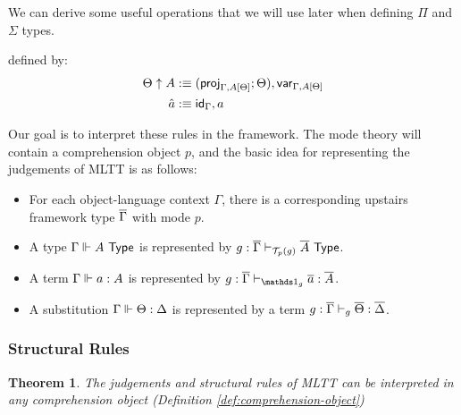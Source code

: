 \documentclass[10pt]{article}
\newtheorem{theorem}{Theorem}
\theoremstyle{definition}
\newcommand{\yields}{\vdash}
\newcommand{\TYPE}{\,\,\mathsf{Type}}
\newcommand{\id}{\mathsf{id}}
\newcommand\El[2]{\mathcal{T}_{#1}(#2)}
\begin{document}
We can derive some useful operations that we will use later when defining $\Pi$ and $\Sigma$ types.
defined by:
\begin{align*}
\Theta \uparrow A &:\equiv (\proj{\Gamma, A[\Theta]}; \Theta) , \qvar{\Gamma, A[\Theta]} \\
\hat{a} &:\equiv \id_{\Gamma} , a
\end{align*}

Our goal is to interpret these rules in the framework. The mode theory will contain a comprehension object $p$, and the basic idea for representing the judgements of MLTT is as follows:

\begin{itemize}
\item For each object-language context $\Gamma$, there is a corresponding upstairs framework type $\overline{\Gamma}$ with mode $p$.

\item A type $\Gamma \qyields A \TYPE$ is represented by $g : \upstairs{\Gamma} \yields_{\El{p}{g}} \upstairs{A} \TYPE$.
  
\item A term $\Gamma \Vdash a : A$ is represented by $g : \upstairs{\Gamma} \yields_{\One_g} \upstairs{a} : \upstairs{A}$.

\item A substitution $\Gamma \Vdash \Theta : \Delta$ is represented by a term $g : \upstairs{\Gamma} \yields_g \upstairs{\Theta} : \upstairs{\Delta}$.
\end{itemize}

\subsubsection{Structural Rules}

\begin{theorem}
The judgements and structural rules of MLTT can be interpreted in any comprehension object (Definition \ref{def:comprehension-object})
\end{theorem}
\end{document}
